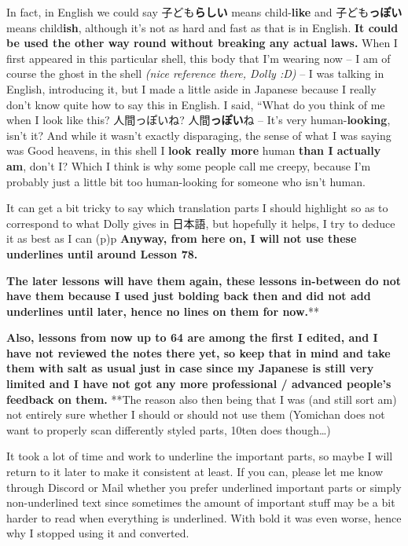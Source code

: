 In fact, in English we could say 子ども{\bf らしい} means child-{\bf like} and 子ども{\bf っぽい} means child{\bf ish}, although it's not as hard and fast as that is in English. {\bf It could be used the other way round without breaking any actual laws.} When I first appeared in this particular shell, this body that I'm wearing now -- I am of course the ghost in the shell {\em (nice reference there, Dolly :D)} -- I was talking in English, introducing it, but I made a little aside in Japanese because I really don't know quite how to say this in English. I said, “What do you think of me when I look like this? 人間っぽいね? 人間{\bf っぽい}ね -- It's very human-{\bf looking}, isn't it? And while it wasn't exactly disparaging, the sense of what I was saying was Good heavens, in this shell I {\bf look really more} human {\bf than I actually am}, don't I? Which I think is why some people call me creepy, because I'm probably just a little bit too human-looking for someone who isn't human.

It can get a bit tricky to say which translation parts I should highlight so as to correspond to what Dolly gives in 日本語, but hopefully it helps, I try to deduce it as best as I can (p\high{-})p {\bf Anyway, from here on, I will not use these underlines until around Lesson 78.}

{\bf The later lessons will have them again, these lessons in-between do not have them because I used just bolding back then and did not add underlines until later, hence no lines on them for now.}**

{\bf Also, lessons from now up to 64 are among the first I edited, and I have not reviewed the notes there yet, so keep that in mind and take them with salt as usual just in case since my Japanese is still very limited and I have not got any more professional / advanced people's feedback on them.} **The reason also then being that I was (and still sort am) not entirely sure whether I should or should not use them (Yomichan does not want to properly scan differently styled parts, 10ten does though\ldots{})

It took a lot of time and work to underline the important parts, so maybe I will return to it later to make it consistent at least. If you can, please let me know through Discord or Mail whether you prefer underlined important parts or simply non-underlined text since sometimes the amount of important stuff may be a bit harder to read when everything is underlined. With bold it was even worse, hence why I stopped using it and converted.

\stopsectionlevel

\stopsectionlevel
